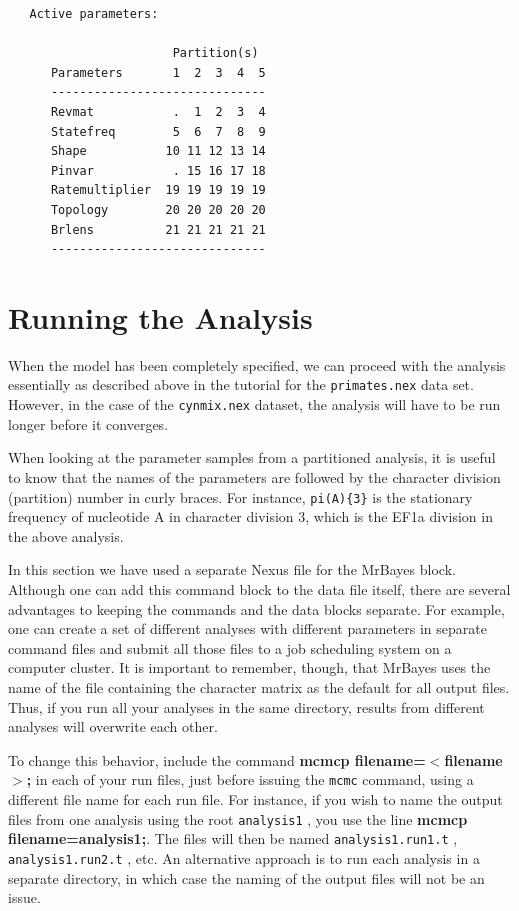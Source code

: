 \documentclass[12pt]{book}
\newcommand{\ttt}[1]{\texttt{#1} }
\begin{document}
\begin{singlespacing}
\small
\begin{verbatim}
   Active parameters:
 
                       Partition(s)
      Parameters       1  2  3  4  5
      ------------------------------
      Revmat           .  1  2  3  4
      Statefreq        5  6  7  8  9
      Shape           10 11 12 13 14
      Pinvar           . 15 16 17 18
      Ratemultiplier  19 19 19 19 19
      Topology        20 20 20 20 20
      Brlens          21 21 21 21 21
      ------------------------------
\end{verbatim}
\normalsize
\end{singlespacing}

\section{Running the Analysis}

When the model has been completely specified, we can proceed with the analysis essentially as
described above in the tutorial for the \ttt{primates.nex} data set. However, in the case of the
\ttt{cynmix.nex} dataset, the analysis will have to be run longer before it converges.

When looking at the parameter samples from a partitioned analysis, it is useful to know that the
names of the parameters are followed by the character division (partition) number in curly braces.
For instance, \ttt{pi(A)\{3\}} is the stationary frequency of nucleotide A in character division
3, which is the EF1a division in the above analysis.

In this section we have used a separate Nexus file for the MrBayes block. Although one can add this
command block to the data file itself, there are several advantages to keeping the commands and the
data blocks separate. For example, one can create a set of different analyses with different
parameters in separate command files and submit all those files to a job scheduling system on a
computer cluster. It is important to remember, though, that MrBayes uses the name of the file
containing the character matrix as the default for all output files. Thus, if you run all your
analyses in the same directory, results from different analyses will overwrite each other.

To change this behavior, include the command \textbf{mcmcp filename=$<$filename$>$;} in each of
your run files, just before issuing the \ttt{mcmc} command, using a different file name for each
run file. For instance, if you wish to name the output files from one analysis using the root
\ttt{analysis1}, you use the line \textbf{mcmcp filename=analysis1;}. The files will then be
named \ttt{analysis1.run1.t}, \ttt{analysis1.run2.t}, etc. An alternative approach is to run
each analysis in a separate directory, in which case the naming of the output files will not be an
issue.
\end{document}
